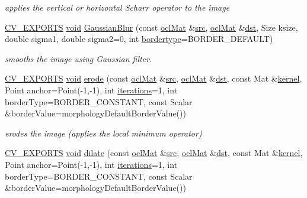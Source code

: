 \begin{DoxyCompactItemize}
\begin{DoxyCompactList}\small\item\em applies the vertical or horizontal Scharr operator to the image \end{DoxyCompactList}\item 
\hyperlink{core_2types__c_8h_a1bf9f0e121b54272da02379cfccd0a2b}{C\-V\-\_\-\-E\-X\-P\-O\-R\-T\-S} \hyperlink{legacy_8hpp_a8bb47f092d473522721002c86c13b94e}{void} \hyperlink{namespacecv_1_1ocl_aae7628c77a5b3d11e626f3ddbe5e9336}{Gaussian\-Blur} (const \hyperlink{classcv_1_1ocl_1_1oclMat}{ocl\-Mat} \&\hyperlink{legacy_8hpp_a371cd109b74033bc4366f584edd3dacc}{src}, \hyperlink{classcv_1_1ocl_1_1oclMat}{ocl\-Mat} \&\hyperlink{photo__c_8h_aed13e2a25279b24dc954073233fef7a5}{dst}, Size ksize, double sigma1, double sigma2=0, int \hyperlink{imgproc__c_8h_a217d51a46c1bcfec1157d02663e6e499}{bordertype}=B\-O\-R\-D\-E\-R\-\_\-\-D\-E\-F\-A\-U\-L\-T)
\begin{DoxyCompactList}\small\item\em smooths the image using Gaussian filter. \end{DoxyCompactList}\item 
\hyperlink{core_2types__c_8h_a1bf9f0e121b54272da02379cfccd0a2b}{C\-V\-\_\-\-E\-X\-P\-O\-R\-T\-S} \hyperlink{legacy_8hpp_a8bb47f092d473522721002c86c13b94e}{void} \hyperlink{namespacecv_1_1ocl_af0372dac18c8f3c360968acfdac2dfc4}{erode} (const \hyperlink{classcv_1_1ocl_1_1oclMat}{ocl\-Mat} \&\hyperlink{legacy_8hpp_a371cd109b74033bc4366f584edd3dacc}{src}, \hyperlink{classcv_1_1ocl_1_1oclMat}{ocl\-Mat} \&\hyperlink{photo__c_8h_aed13e2a25279b24dc954073233fef7a5}{dst}, const Mat \&\hyperlink{imgproc__c_8h_a863a75780ba6c5de552f5361cb0d2c89}{kernel}, Point anchor=Point(-\/1,-\/1), int \hyperlink{tracking_8hpp_a17372ac3c8ba01bc6cfc265b2824992e}{iterations}=1, int border\-Type=B\-O\-R\-D\-E\-R\-\_\-\-C\-O\-N\-S\-T\-A\-N\-T, const Scalar \&border\-Value=morphology\-Default\-Border\-Value())
\begin{DoxyCompactList}\small\item\em erodes the image (applies the local minimum operator) \end{DoxyCompactList}\item 
\hyperlink{core_2types__c_8h_a1bf9f0e121b54272da02379cfccd0a2b}{C\-V\-\_\-\-E\-X\-P\-O\-R\-T\-S} \hyperlink{legacy_8hpp_a8bb47f092d473522721002c86c13b94e}{void} \hyperlink{namespacecv_1_1ocl_ab8992ada35217191cf4c6e9ebd93fe1f}{dilate} (const \hyperlink{classcv_1_1ocl_1_1oclMat}{ocl\-Mat} \&\hyperlink{legacy_8hpp_a371cd109b74033bc4366f584edd3dacc}{src}, \hyperlink{classcv_1_1ocl_1_1oclMat}{ocl\-Mat} \&\hyperlink{photo__c_8h_aed13e2a25279b24dc954073233fef7a5}{dst}, const Mat \&\hyperlink{imgproc__c_8h_a863a75780ba6c5de552f5361cb0d2c89}{kernel}, Point anchor=Point(-\/1,-\/1), int \hyperlink{tracking_8hpp_a17372ac3c8ba01bc6cfc265b2824992e}{iterations}=1, int border\-Type=B\-O\-R\-D\-E\-R\-\_\-\-C\-O\-N\-S\-T\-A\-N\-T, const Scalar \&border\-Value=morphology\-Default\-Border\-Value())

\end{DoxyCompactItemize}
